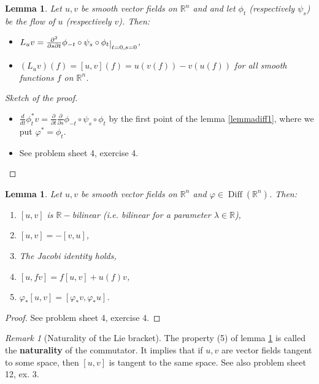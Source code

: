 \documentclass[a4paper,11pt,titlepage, article, oneside]{memoir}
\numberwithin{equation}{section}
\newtheorem{lemma}[theorem]{Lemma}
\theoremstyle{definition}
\theoremstyle{remark}
\newtheorem{remark}[theorem]{Remark}
\DeclareMathOperator{\Diff}{Diff}
\newcommand{\rfield}{\mathbb{R}}
\newcommand{\restrict}[2]{{#1}\raisebox{-.5ex}{$|$}_{#2}}
\begin{document}
\begin{lemma}
  Let $u, v$ be smooth vector fields on $\rfield^n$ and and let $\phi_t$ (respectively $\psi_s$) be the flow of $u$ (respectively $v$). Then:
  \begin{itemize}
    \item $L_u v = \restrict{\frac{\partial^2}{\partial s \partial t} \phi_{-t} \circ \psi_s \circ \phi_t}{t=0,s=0}$,
    \item $(L_u v) (f) = [u, v](f) = u(v(f)) - v(u(f))$ for all smooth functions $f$ on $\rfield^n$.
  \end{itemize}
\end{lemma}
\begin{proof}[Sketch of the proof]
$ $
\begin{itemize}
\item $\frac{d}{dt}\phi_t^* v = \frac{\partial}{\partial t} \frac{\partial}{\partial s} \phi_{-t} \circ \psi_s \circ \phi_t$ by the first point of the lemma \ref{lemmadiff1}, where we put $\varphi^* = \phi_t$.
\item See problem sheet 4, exercise 4. \qedhere
\end{itemize}
\end{proof}

\begin{lemma} \label{commlemma}
  Let $u, v$ be smooth vector fields on $\rfield^n$ and $\varphi \in \Diff(\rfield^n)$. Then:
  \begin{enumerate}
    \item $[u, v]$ is $\rfield-$bilinear (i.e. bilinear for a parameter $\lambda \in \rfield$),
    \item $[u, v] = - [v, u]$,
    \item The Jacobi identity holds,
    \item $[u, fv] = f[u, v] + u(f)v$,
    \item $\varphi_*[u, v] = [\varphi_* v, \varphi_* u]$.
  \end{enumerate}
\end{lemma}
\begin{proof}
See problem sheet 4, exercise 4.
\end{proof}

\begin{remarkbox} \begin{remark}[Naturality of the Lie bracket]
The property (5) of lemma \ref{commlemma} is called the \textbf{naturality} of the commutator. It implies that if $u, v$ are vector fields tangent to some space, then $[u, v]$ is tangent to the same space. See also problem sheet 12, ex. 3.
\end{remark} \end{remarkbox}
\end{document}
